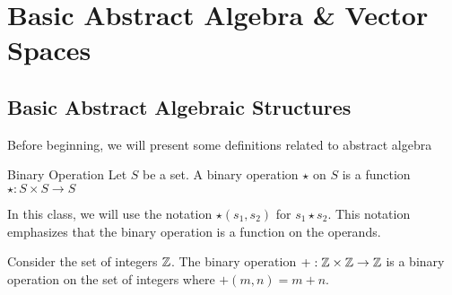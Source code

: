 \documentclass[main.tex]{subfiles}
\begin{document}
    \chapter{Basic Abstract Algebra \& Vector Spaces}

    \section{Basic Abstract Algebraic Structures}
    Before beginning, we will present some definitions related to abstract algebra

    \begin{defn}{Binary Operation}{}
        Let $S$ be a set. A binary operation $\star$ on $S$ is a function $\star : S\times S \to S$
    \end{defn}
    In this class, we will use the notation $\star(s_1, s_2)$ for $s_1 \star s_2$. This notation emphasizes that the binary operation is a function on the operands.
    
    \begin{example}{}{}
        Consider the set of integers $\mathbb{Z}$. The binary operation $+: \mathbb{Z} \times \mathbb{Z} \to \mathbb{Z}$ is a binary operation on the set of integers where $+(m, n) = m + n$.
    \end{example}
\end{document}
